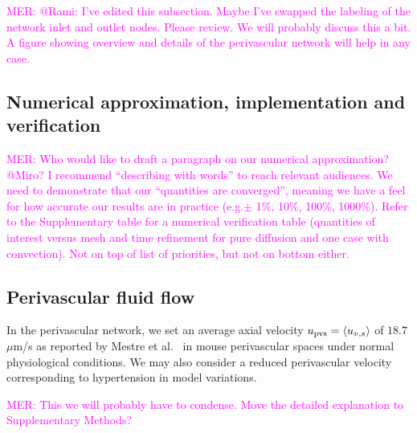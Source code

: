\documentclass[fleqn,10pt]{wlscirep}
\newcommand{\mer}[1]{\textcolor{magenta}{#1}}
\begin{document}
\noindent \mer{MER: @Rami: I've edited this subsection. Maybe I've swapped the labeling of the network inlet and outlet nodes. Please review. We will probably discuss this a bit. A figure showing overview and details of the perivascular network will help in any case.}


\subsection*{Numerical approximation, implementation and verification}

\mer{MER: Who would like to draft a paragraph on our numerical approximation? @Miro? I recommend ``describing with words'' to reach relevant audiences. We need to demonstrate that our ``quantities are converged'', meaning we have a feel for how accurate our results are in practice (e.g.$\pm$ 1\%, 10\%, 100\%, 1000\%). Refer to the Supplementary table for a numerical verification table (quantities of interest versus mesh and time refinement for pure diffusion and one case with convection). Not on top of list of priorities, but not on bottom either.} 

\subsection*{Perivascular fluid flow}

In the perivascular network, we set an average axial velocity $u_{\rm
  pvs} = \langle u_{v, s} \rangle$ of $18.7$ $\mu$m/s as reported by
Mestre et al.~\cite{mestre2018flow} in mouse perivascular spaces under
normal physiological conditions. We may also consider a reduced
perivascular velocity corresponding to hypertension in model
variations.

\mer{MER: This we will probably have to condense. Move the detailed explanation to Supplementary Methods?}
\end{document}
